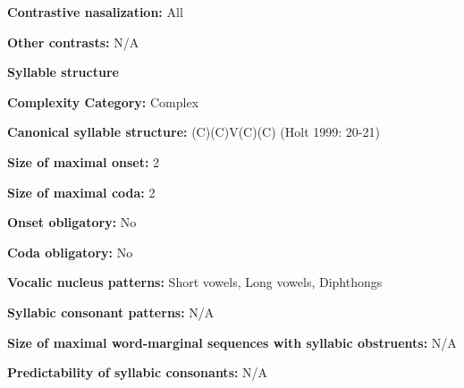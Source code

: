 \begin{styleBody}
\textbf{Contrastive nasalization:} All
\end{styleBody}

\begin{styleBody}
\textbf{Other contrasts:} N/A
\end{styleBody}

\begin{styleBody}
\textbf{Syllable structure}
\end{styleBody}

\begin{styleBody}
\textbf{Complexity Category:} Complex
\end{styleBody}

\begin{styleBody}
\textbf{Canonical syllable structure:} (C)(C)V(C)(C)\textbf{ }(Holt 1999: 20-21)
\end{styleBody}

\begin{styleBody}
\textbf{Size of maximal onset:} 2
\end{styleBody}

\begin{styleBody}
\textbf{Size of maximal coda:} 2
\end{styleBody}

\begin{styleBody}
\textbf{Onset obligatory:} No
\end{styleBody}

\begin{styleBody}
\textbf{Coda obligatory:} No
\end{styleBody}

\begin{styleBody}
\textbf{Vocalic nucleus patterns:} Short vowels, Long vowels, Diphthongs
\end{styleBody}

\begin{styleBody}
\textbf{Syllabic consonant patterns:} N/A
\end{styleBody}

\begin{styleBody}
\textbf{Size of maximal word{}-marginal sequences with syllabic obstruents:} N/A
\end{styleBody}

\begin{styleBody}
\textbf{Predictability of syllabic consonants:} N/A
\end{styleBody}

